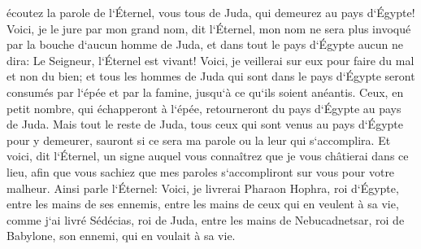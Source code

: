 \verse écoutez la parole de l`Éternel, vous tous de Juda, qui demeurez au pays d`Égypte! Voici, je le jure par mon grand nom, dit l`Éternel, mon nom ne sera plus invoqué par la bouche d`aucun homme de Juda, et dans tout le pays d`Égypte aucun ne dira: Le Seigneur, l`Éternel est vivant! 
\verse Voici, je veillerai sur eux pour faire du mal et non du bien; et tous les hommes de Juda qui sont dans le pays d`Égypte seront consumés par l`épée et par la famine, jusqu`à ce qu`ils soient anéantis. 
\verse Ceux, en petit nombre, qui échapperont à l`épée, retourneront du pays d`Égypte au pays de Juda. Mais tout le reste de Juda, tous ceux qui sont venus au pays d`Égypte pour y demeurer, sauront si ce sera ma parole ou la leur qui s`accomplira. 
\verse Et voici, dit l`Éternel, un signe auquel vous connaîtrez que je vous châtierai dans ce lieu, afin que vous sachiez que mes paroles s`accompliront sur vous pour votre malheur. 
\verse Ainsi parle l`Éternel: Voici, je livrerai Pharaon Hophra, roi d`Égypte, entre les mains de ses ennemis, entre les mains de ceux qui en veulent à sa vie, comme j`ai livré Sédécias, roi de Juda, entre les mains de Nebucadnetsar, roi de Babylone, son ennemi, qui en voulait à sa vie. 

\chapter{}


